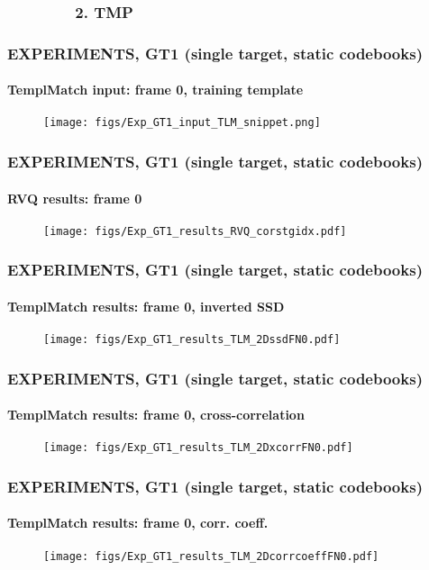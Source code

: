 \subsubsection{\ \ \ \ \ \ \ \ 2. TMP}

\begin{frame}
\frametitle{\small EXPERIMENTS, GT1 (single target, static codebooks)}
\framesubtitle{TemplMatch input: frame 0, training template}
\mypagenum
	\begin{figure}
		\texttt{[image: figs/Exp\_GT1\_input\_TLM\_snippet.png]}
	\end{figure}
\end{frame}



\begin{frame}[plain]
\frametitle{\small EXPERIMENTS, GT1 (single target, static codebooks)}
\framesubtitle{RVQ results: frame 0}
\mypagenum
	\begin{changemargin}{-1.35in}{0in}
		\begin{figure}
			\texttt{[image: figs/Exp\_GT1\_results\_RVQ\_corstgidx.pdf]}
		\end{figure}
	\end{changemargin}
\end{frame}




\begin{frame}
\frametitle{\small EXPERIMENTS, GT1 (single target, static codebooks)}
\framesubtitle{TemplMatch results: frame 0, inverted SSD}
\mypagenum
	\begin{figure}
		\texttt{[image: figs/Exp\_GT1\_results\_TLM\_2DssdFN0.pdf]}
	\end{figure}
\end{frame}




\begin{frame}
\frametitle{\small EXPERIMENTS, GT1 (single target, static codebooks)}
\framesubtitle{TemplMatch results: frame 0, cross-correlation}
\mypagenum
	\begin{figure}
		\texttt{[image: figs/Exp\_GT1\_results\_TLM\_2DxcorrFN0.pdf]}
	\end{figure}
\end{frame}


\begin{frame}
\frametitle{\small EXPERIMENTS, GT1 (single target, static codebooks)}
\framesubtitle{TemplMatch results:  frame 0, corr. coeff.}
\mypagenum
	\begin{figure}
		\texttt{[image: figs/Exp\_GT1\_results\_TLM\_2DcorrcoeffFN0.pdf]}
	\end{figure}
\end{frame}


